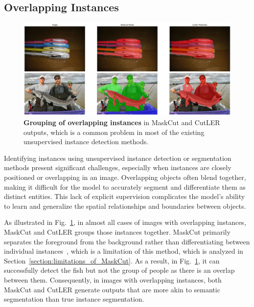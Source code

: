 \subsection{Overlapping Instances}
\label{section:overlapping_instances_analysis}
\begin{figure}
	\centering
	\includegraphics[width=1\textwidth]{Images/main/cutler-prob-overlap.png}
	\caption[\textbf{Cutler's Performance on Images with Overlapping Instances}]{\textbf{Grouping of overlapping instances} in MaskCut and CutLER outputs, which is a common problem in most of the existing unsupervised instance detection methods.}
	\label{fig:cutler_overlapping_instances_eg}
\end{figure}

Identifying instances using unsupervised instance detection or segmentation methods present significant challenges, especially when instances are closely positioned or overlapping in an image. Overlapping objects often blend together, making it difficult for the model to accurately segment and differentiate them as distinct entities. This lack of explicit supervision complicates the model's ability to learn and generalize the spatial relationships and boundaries between objects.

As illustrated in Fig.~\ref{fig:cutler_overlapping_instances_eg}, in almost all cases of images with overlapping instances, MaskCut and CutLER groups those instances together. MaskCut primarily separates the foreground from the background rather than differentiating between individual instances~\cite{engstler2023understanding}, which is a limitation of this method, which is analyzed in Section~\ref{section:limitations_of_MaskCut}. As a result, in Fig.~\ref{fig:cutler_overlapping_instances_eg}, it can successfully detect the fish but not the group of people as there is an overlap between them. Consequently, in images with overlapping instances, both MaskCut and CutLER generate outputs that are more akin to semantic segmentation than true instance segmentation.

